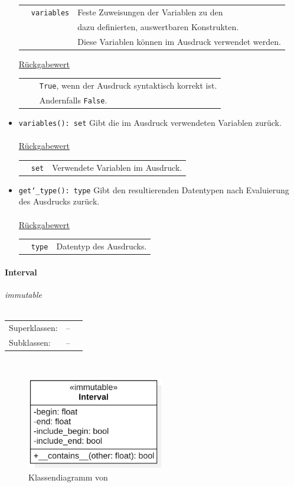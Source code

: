 \documentclass{article}
\newcommand{\classheader}[2][]{\paragraph{#2}
\mbox{}\textit{#1}\\\\}
\newcommand{\classref}[1]{\texttt{\nameref{cls:#1}}}
\begin{document}
\begin{itemize}
\begin{tabular}{lll}
 & \texttt{variables} & Feste Zuweisungen der Variablen zu den \\&& dazu definierten, auswertbaren Konstrukten. \\&& Diese Variablen können im Ausdruck verwendet werden. \\
\end{tabular}

\underline{Rückgabewert}

\begin{tabular}{lll}
 & \classref{ErrorReport} & \texttt{True}, wenn der Ausdruck syntaktisch korrekt ist. \\&& Andernfalls \texttt{False}. \\
\end{tabular}

\item \texttt{variables(): set} \newline Gibt die im Ausdruck verwendeten Variablen zurück.
\\\\
\underline{{Rückgabewert}}

\begin{tabular}{lll}
 & \texttt{set} & Verwendete Variablen im Ausdruck. \\
\end{tabular}

\item \texttt{get\char`_type(): type} \newline Gibt den resultierenden Datentypen nach Evaluierung des Ausdrucks zurück.
\\\\
\underline{{Rückgabewert}}

\begin{tabular}{lll}
 & \texttt{type} & Datentyp des Ausdrucks. \\
\end{tabular}
\end{itemize}


\newpage
\classheader[\flqq{}immutable\frqq]{Interval}\label{cls:Interval}
\begin{tabular}{lll}
 Superklassen: & --\\
 Subklassen: & --\\
\end{tabular}\\
\begin{figure}[H]%
    \centering
    \includegraphics[width=6cm]{entwurf/Entwurf_dokument/img/cls/model/Interval.png}
    \caption{Klassendiagramm von \classref{Interval}}
\end{figure}
\end{document}

